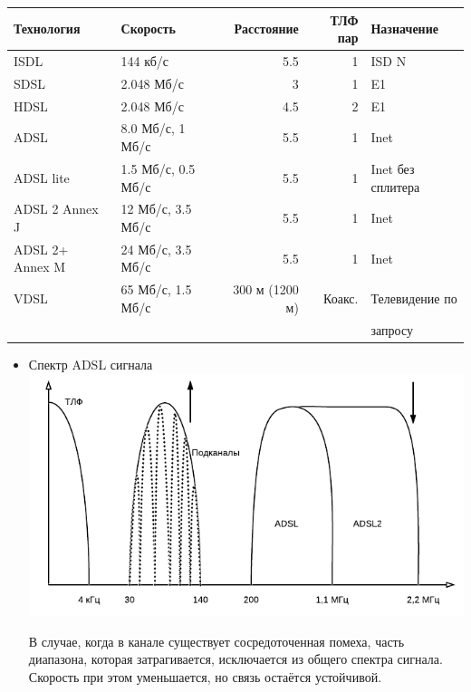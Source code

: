 \documentclass[12pt, russian, oneside, article]{ncc}
\begin{document}
\begin{center}
\begin{tabular}{llrrl}
 Технология  &  Скорость    &  Расстояние  &     ТЛФ пар  &  Назначение  \\
\hline
 ISDL        &  144 кб/с    &         5.5  &           1  &  ISD N       \\
 SDSL        &  2.048 Мб/с  &           3  &           1  &  E1          \\
 HDSL        &  2.048 Мб/с  &         4.5  &           2  &  E1          \\
\hline
 ADSL        &  8.0 Мб/с, 1 Мб/с  &         5.5  &           1  &  Inet        \\
 ADSL lite   &  1.5 Мб/с, 0.5 Мб/с  &         5.5  &           1  &  Inet без сплитера  \\
 ADSL 2 Annex J  &  12 Мб/с, 3.5 Мб/с  &         5.5  &           1  &  Inet        \\
 ADSL 2+ Annex M  &  24 Мб/с, 3.5 Мб/с  &         5.5  &           1  &  Inet        \\
\hline
 VDSL        &  65 Мб/с, 1.5 Мб/с  &  300 м (1200 м)  &      Коакс.  &  Телевидение по  \\
             &              &              &              &  запросу     \\
\end{tabular}
\end{center}
\begin{itemize}

\item Спектр ADSL сигнала\\
\label{sec-5_2_10_1}%
\includegraphics[]{images/SiSPI/spectr.png}

В случае, когда в канале существует сосредоточенная помеха, часть диапазона, которая затрагивается, исключается из общего спектра сигнала. Скорость при этом уменьшается, но связь остаётся устойчивой.

\end{itemize} %
\end{document}
